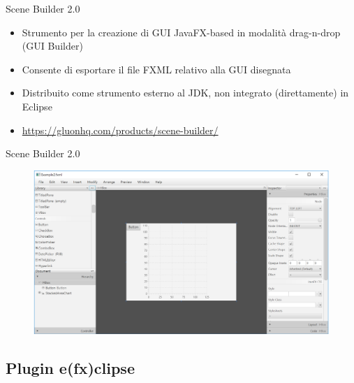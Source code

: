 \documentclass[presentation]{beamer}
\begin{document}
\begin{frame}{Scene Builder 2.0}
\begin{itemize}\itemsep10pt
\item Strumento per la creazione di GUI JavaFX-based in modalità drag-n-drop (GUI Builder)
\item Consente di esportare il file FXML relativo alla GUI disegnata
\item Distribuito come strumento esterno al JDK, non integrato (direttamente) in Eclipse
\item \url{https://gluonhq.com/products/scene-builder/}
\end{itemize}
\end{frame}

\begin{frame}{Scene Builder 2.0}
\begin{figure}
\includegraphics[width=\textwidth]{img/scenebuilder.png}
\end{figure}
\end{frame}

\subsection{Plugin e(fx)clipse}
\end{document}
